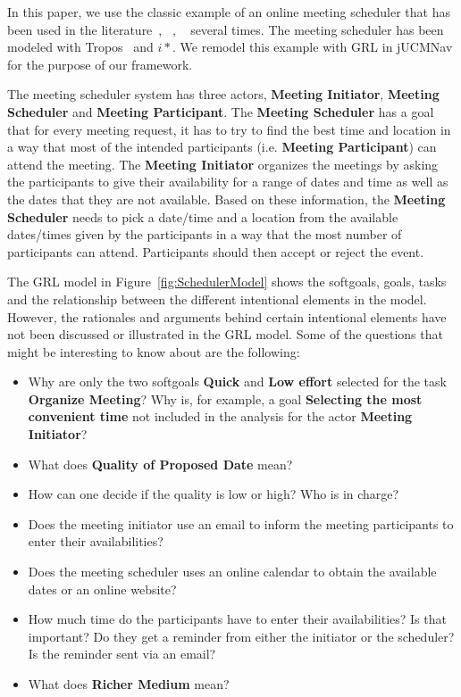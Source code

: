 In this paper, we use the classic example of an online meeting scheduler that has been used in the literature~\cite{}, ~\cite{}, ~\cite{} several times. The meeting scheduler has been modeled with Tropos~\cite{} and $i*$. We remodel this example with GRL in jUCMNav for the purpose of our framework. 

The meeting scheduler system has three actors, \textbf{Meeting Initiator}, \textbf{Meeting Scheduler} and \textbf{Meeting Participant}. The \textbf{Meeting Scheduler} has a goal that for every meeting request, it has to try to find the best time and location in a way that most of the intended participants (i.e. \textbf{Meeting Participant}) can attend the meeting. The \textbf{Meeting Initiator} organizes the meetings by asking the participants to give their availability for a range of dates and time as well as the dates that they are not available. Based on these information, the \textbf{Meeting Scheduler} needs to pick a date/time and a location from the available dates/times given by the participants in a way that the most number of participants can attend. Participants should then accept or reject the event. 

The GRL model in Figure~\ref{fig:SchedulerModel} shows the softgoals, goals, tasks and the relationship between the different intentional elements in the model. However, the rationales and arguments behind certain intentional elements have not been discussed or illustrated in the GRL model. Some of the questions that might be interesting to know about are the following:

\begin{itemize}
	\item Why are only the two softgoals \textbf{Quick} and \textbf{Low effort} selected for the task \textbf{Organize Meeting}? Why is, for example, a goal \textbf{Selecting the most convenient time} not included in the analysis for the actor \textbf{Meeting Initiator}?
	\item What does \textbf{Quality of Proposed Date} mean?
	\item How can one decide if the quality is low or high? Who is in charge? 
	\item Does the meeting initiator use an email to inform the meeting participants to enter their availabilities? 
	\item Does the meeting scheduler uses an online calendar to obtain the available dates or an online website?
	\item How much time do the participants have to enter their availabilities? Is that important? Do they get a reminder from either the initiator or the scheduler? Is the reminder sent via an email? 
	\item What does \textbf{Richer Medium} mean? 
\end{itemize}

